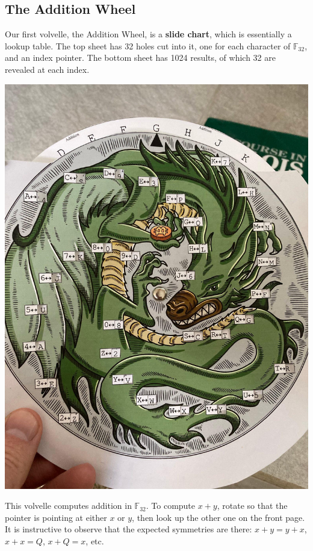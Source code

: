 \documentclass[letterpaper]{article}
\newcommand{\fttwo}{\mathbb{F}_{32}}
\begin{document}
\subsection{The Addition Wheel}

Our first volvelle, the Addition Wheel, is a \textbf{slide chart}, which is
essentially a lookup table. The top sheet has 32 holes cut into it, one for
each character of $\fttwo$, and an index pointer. The bottom sheet has 1024
results, of which 32 are revealed at each index.

\begin{center}\includegraphics[scale=0.25]{images/addition-wheel.jpg}\end{center}


This volvelle computes addition in $\fttwo$. To compute $x+y$, rotate so that
the pointer is pointing at either $x$ or $y$, then look up the other one on
the front page. It is instructive to observe that the expected symmetries are
there: $x+y=y+x$, $x+x=Q$, $x+Q=x$, etc.
\end{document}
